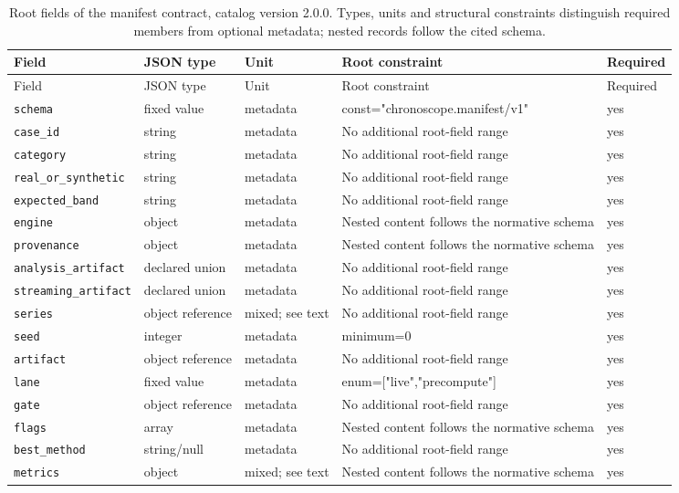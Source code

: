 \begingroup\small
\begin{longtable}{@{}p{}p{}p{}p{}p{}@{}}
\caption{Root fields of the manifest contract, catalog version 2.0.0. Types, units and structural constraints distinguish required members from optional metadata; nested records follow the cited schema.}\label{tab:contract-manifest}\\
\toprule Field & JSON type & Unit & Root constraint & Required\\\midrule\endfirsthead
\toprule Field & JSON type & Unit & Root constraint & Required\\\midrule\endhead
\texttt{schema} & fixed value & metadata & const="chronosco\allowbreak{}pe.manifest/v1" & yes\\
\texttt{case\_\allowbreak{}id} & string & metadata & No additional root-field range & yes\\
\texttt{category} & string & metadata & No additional root-field range & yes\\
\texttt{real\_\allowbreak{}or\_\allowbreak{}synthetic} & string & metadata & No additional root-field range & yes\\
\texttt{expected\_\allowbreak{}band} & string & metadata & No additional root-field range & yes\\
\texttt{engine} & object & metadata & Nested content follows the normative schema & yes\\
\texttt{provenance} & object & metadata & Nested content follows the normative schema & yes\\
\texttt{analysis\_\allowbreak{}artifact} & declared union & metadata & No additional root-field range & yes\\
\texttt{streaming\_\allowbreak{}artifact} & declared union & metadata & No additional root-field range & yes\\
\texttt{series} & object reference & mixed; see text & No additional root-field range & yes\\
\texttt{seed} & integer & metadata & minimum=0 & yes\\
\texttt{artifact} & object reference & metadata & No additional root-field range & yes\\
\texttt{lane} & fixed value & metadata & enum=["live","pr\allowbreak{}ecompute"] & yes\\
\texttt{gate} & object reference & metadata & No additional root-field range & yes\\
\texttt{flags} & array & metadata & Nested content follows the normative schema & yes\\
\texttt{best\_\allowbreak{}method} & string/null & metadata & No additional root-field range & yes\\
\texttt{metrics} & object & mixed; see text & Nested content follows the normative schema & yes\\
\bottomrule
\end{longtable}
\endgroup
